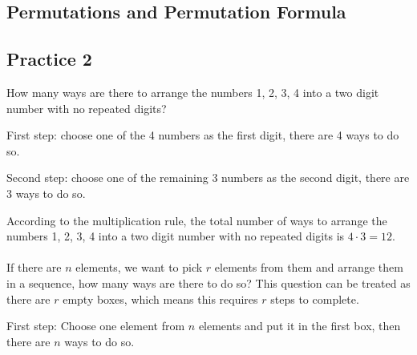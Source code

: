 \documentclass{report}
\begin{document}
\begin{multicols}{2}
  \section{Permutations and Permutation Formula}

  \subsection{Practice 2}

  How many ways are there to arrange the numbers 1, 2, 3, 4 into a two digit
  number with no repeated digits? \sol{}

  First step: choose one of the 4 numbers as the first digit, there are 4 ways to
  do so.

  Second step: choose one of the remaining 3 numbers as the second digit, there
  are 3 ways to do so.

  According to the multiplication rule, the total number of ways to arrange the
  numbers 1, 2, 3, 4 into a two digit number with no repeated digits is $4 \cdot
    3 = 12$. \\\\ If there are $n$ elements, we want to pick $r$ elements from them
  and arrange them in a sequence, how many ways are there to do so? This question
  can be treated as there are $r$ empty boxes, which means this requires $r$
  steps to complete.

  \begin{center}
  \end{center}

  First step: Choose one element from $n$ elements and put it in the first box,
  then there are $n$ ways to do so.


\end{multicols}
\end{document}
